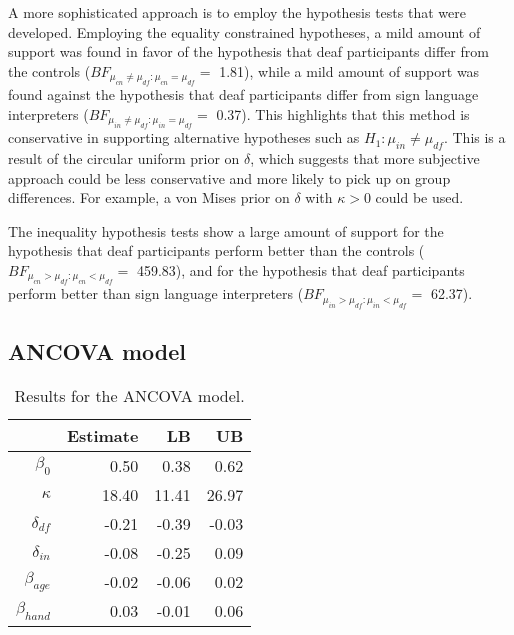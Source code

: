 \documentclass[11pt,a4paper]{article}\usepackage[]{graphicx}\usepackage[]{color}
\begin{document}
A more sophisticated approach is to employ the hypothesis tests that were developed. Employing the equality constrained hypotheses, a mild amount of support was found in favor of the hypothesis that deaf participants differ from the controls (\( BF_{\mu_{cn} \neq \mu_{df}:\mu_{cn} = \mu_{df}} = \) 1.81), while  a mild amount of support was found against  the hypothesis that deaf participants differ from sign language interpreters  (\( BF_{\mu_{in} \neq \mu_{df}:\mu_{in} = \mu_{df}} = \) 0.37). This highlights that this method is conservative in supporting alternative hypotheses such as \( H_1 : \mu_{in} \neq \mu_{df}.\) This is a result of the circular uniform prior on \( \delta \), which suggests that more subjective approach could be less conservative and more likely to pick up on group differences. For example, a von Mises prior on \( \delta \) with \( \kappa > 0\) could be used.

The inequality hypothesis tests show a large amount of support for the hypothesis that deaf participants perform better than the controls (\( BF_{\mu_{cn} > \mu_{df}:\mu_{cn} < \mu_{df}} = \) 459.83), and for the hypothesis that deaf participants perform better than sign language interpreters (\( BF_{\mu_{in} > \mu_{df}:\mu_{in} < \mu_{df}} = \) 62.37).





\subsection{ANCOVA model}




\begin{table}[btp]
\centering
\caption{Results for the ANCOVA model.} 
\label{ANCOVATable}
\begin{tabular}{rrrr}
  \toprule
 & Estimate & LB & UB \\ 
  \midrule
$\beta_0$ & 0.50 & 0.38 & 0.62 \\ 
  $\kappa$ & 18.40 & 11.41 & 26.97 \\ 
  $\delta_{df}$ & -0.21 & -0.39 & -0.03 \\ 
  $\delta_{in}$ & -0.08 & -0.25 & 0.09 \\ 
  $\beta_{age}$ & -0.02 & -0.06 & 0.02 \\ 
  $\beta_{hand}$ & 0.03 & -0.01 & 0.06 \\ 
   \bottomrule
\end{tabular}
\end{table}
\end{document}
